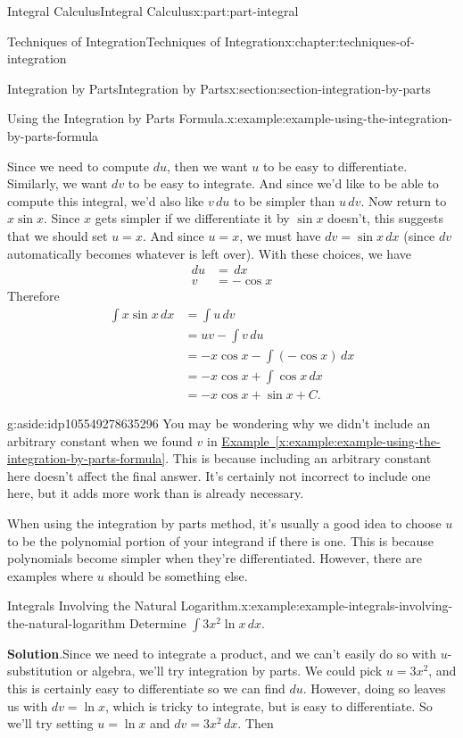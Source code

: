 \documentclass[twoside,10pt,]{book}
\newcommand{\blocktitlefont}{\relax}
\newcommand{\xreffont}{\relax}
\numberwithin{equation}{part}
\begin{document}
\begin{partptx}{Integral Calculus}{}{Integral Calculus}{}{}{x:part:part-integral}
\begin{chapterptx}{Techniques of Integration}{}{Techniques of Integration}{}{}{x:chapter:techniques-of-integration}
\begin{sectionptx}{Integration by Parts}{}{Integration by Parts}{}{}{x:section:section-integration-by-parts}
\begin{example}{Using the Integration by Parts Formula.}{x:example:example-using-the-integration-by-parts-formula}
\par
Since we need to compute \(du\), then we want \(u\) to be easy to differentiate. Similarly, we want \(dv\) to be easy to integrate. And since we'd like to be able to compute this integral, we'd also like \(v\,du\) to be simpler than \(u\,dv\). Now return to \(x\sin x\). Since \(x\) gets simpler if we differentiate it by \(\sin x\) doesn't, this suggests that we should set \(u = x\). And since \(u = x\), we must have \(dv = \sin x\,dx\) (since \(dv\) automatically becomes whatever is left over). With these choices, we have%
%
\begin{align*}
du & = \,dx \\
v & = -\cos x 
\end{align*}
Therefore%
%
\begin{align*}
\int x\sin x\,dx & = \int u\,dv \\
& = uv - \int v\,du \\
& = -x\cos x - \int (-\cos x)\,dx \\
& = -x\cos x + \int\cos x\,dx \\
& = -x\cos x + \sin x + C. 
\end{align*}
\end{example}
\begin{aside}{}{g:aside:idp105549278635296}%
You may be wondering why we didn't include an arbitrary constant when we found \(v\) in \hyperref[x:example:example-using-the-integration-by-parts-formula]{Example~{\xreffont\ref{x:example:example-using-the-integration-by-parts-formula}}}. This is because including an arbitrary constant here doesn't affect the final answer. It's certainly not incorrect to include one here, but it adds more work than is already necessary.%
\end{aside}
When using the integration by parts method, it's usually a good idea to choose \(u\) to be the polynomial portion of your integrand if there is one. This is because polynomials become simpler when they're differentiated. However, there are examples where \(u\) should be something else.%
\begin{example}{Integrals Involving the Natural Logarithm.}{x:example:example-integrals-involving-the-natural-logarithm}%
Determine \(\int 3x^{2}\ln x\,dx\).%
\par\smallskip%
\noindent\textbf{\blocktitlefont Solution}.\hypertarget{g:solution:idp105549278638880}{}\quad{}Since we need to integrate a product, and we can't easily do so with \(u\)-substitution or algebra, we'll try integration by parts. We could pick \(u = 3x^{2}\), and this is certainly easy to differentiate so we can find \(du\). However, doing so leaves us with \(dv = \ln x\), which is tricky to integrate, but is easy to differentiate. So we'll try setting \(u = \ln x\) and \(dv = 3x^{2}\,dx\). Then%

\end{example}
\end{sectionptx}
\end{chapterptx}
\end{partptx}
\end{document}
